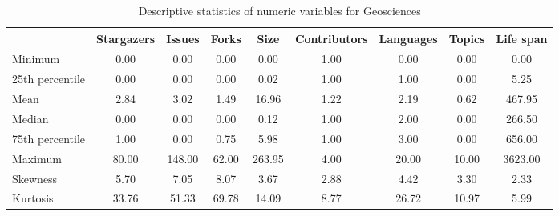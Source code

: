 \begin{table}
\centering
\caption{Descriptive statistics of numeric variables for Geosciences}
\label{tab:Geosciences}
\begin{tabular}{lcccccccc}
\toprule
{} &  Stargazers &  Issues &  Forks &    Size &  Contributors &  Languages &  Topics &  Life span \\
\midrule
Minimum         &        0.00 &    0.00 &   0.00 &    0.00 &          1.00 &       0.00 &    0.00 &       0.00 \\
25th percentile &        0.00 &    0.00 &   0.00 &    0.02 &          1.00 &       1.00 &    0.00 &       5.25 \\
Mean            &        2.84 &    3.02 &   1.49 &   16.96 &          1.22 &       2.19 &    0.62 &     467.95 \\
Median          &        0.00 &    0.00 &   0.00 &    0.12 &          1.00 &       2.00 &    0.00 &     266.50 \\
75th percentile &        1.00 &    0.00 &   0.75 &    5.98 &          1.00 &       3.00 &    0.00 &     656.00 \\
Maximum         &       80.00 &  148.00 &  62.00 &  263.95 &          4.00 &      20.00 &   10.00 &    3623.00 \\
Skewness        &        5.70 &    7.05 &   8.07 &    3.67 &          2.88 &       4.42 &    3.30 &       2.33 \\
Kurtosis        &       33.76 &   51.33 &  69.78 &   14.09 &          8.77 &      26.72 &   10.97 &       5.99 \\
\bottomrule
\end{tabular}
\end{table}
